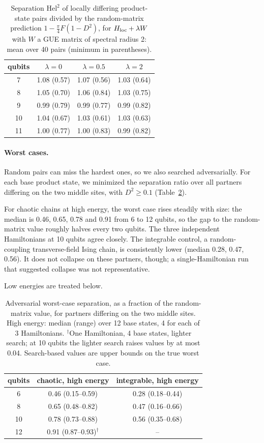 \documentclass[11pt]{article}
\theoremstyle{definition}
\theoremstyle{remark}
\newcommand{\Hel}{\mathrm{Hel}}
\begin{document}
\begin{table}[h]\centering\small
\begin{tabular}{cccc}
\toprule
qubits & $\lambda=0$ & $\lambda=0.5$ & $\lambda=2$\\
\midrule
7 & 1.08 (0.57) & 1.07 (0.56) & 1.03 (0.64)\\
8 & 1.05 (0.70) & 1.06 (0.84) & 1.03 (0.75)\\
9 & 0.99 (0.79) & 0.99 (0.77) & 0.99 (0.82)\\
10 & 1.04 (0.67) & 1.03 (0.61) & 1.03 (0.63)\\
11 & 1.00 (0.77) & 1.00 (0.83) & 0.99 (0.82)\\
\bottomrule
\end{tabular}
\caption{Separation $\Hel^2$ of locally differing product-state pairs divided by the random-matrix prediction $1-\frac\pi4F(1-D^2)$, for $H_{\rm loc}+\lambda W$ with $W$ a GUE matrix of spectral radius 2: mean over 40 pairs (minimum in parentheses).}
\label{tab:deformed}
\end{table}

\paragraph{Worst cases.} Random pairs can miss the hardest ones, so we also searched adversarially. For each base product state, we minimized the separation ratio over all partners differing on the two middle sites, with $D^2\ge0.1$ (Table~\ref{tab:worst}).

For chaotic chains at high energy, the worst case rises steadily with size: the median is 0.46, 0.65, 0.78 and 0.91 from 6 to 12 qubits, so the gap to the random-matrix value roughly halves every two qubits. The three independent Hamiltonians at 10 qubits agree closely.
The integrable control, a random-coupling transverse-field Ising chain, is consistently lower (median 0.28, 0.47, 0.56). It does not collapse on these partners, though; a single-Hamiltonian run that suggested collapse was not representative.

Low energies are treated below.

\begin{table}[h]\centering\small
\begin{tabular}{ccc}
\toprule
qubits & chaotic, high energy & integrable, high energy\\
\midrule
6 & 0.46 (0.15--0.59) & 0.28 (0.18--0.44)\\
8 & 0.65 (0.48--0.82) & 0.47 (0.16--0.66)\\
10 & 0.78 (0.73--0.88) & 0.56 (0.35--0.68)\\
12 & 0.91 (0.87--0.93)$^\dagger$ & --\\
\bottomrule
\end{tabular}
\caption{Adversarial worst-case separation, as a fraction of the random-matrix value, for partners differing on the two middle sites. High energy: median (range) over 12 base states, 4 for each of 3 Hamiltonians. $^\dagger$One Hamiltonian, 4 base states, lighter search; at 10 qubits the lighter search raises values by at most 0.04. Search-based values are upper bounds on the true worst case.}
\label{tab:worst}
\end{table}
\end{document}
